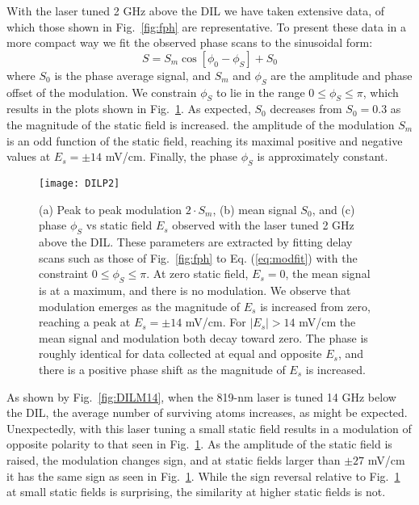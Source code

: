 \documentclass[aps,pra,reprint,groupedaddress]{revtex4-1}
\begin{document}
With the laser tuned 2 GHz above the DIL we have taken extensive data, of which those shown in Fig.~\ref{fig:fph} are representative. To present these data in a more compact way we fit the observed phase scans to the sinusoidal form:
\begin{equation} \label{eq:modfit}
S = S_m \cos{[\phi_0 - \phi_S]} + S_0
\end{equation}
where $S_0$ is the phase average signal, and $S_m$ and $\phi_S$ are the amplitude and phase offset of the modulation. We constrain $\phi_S$ to lie in the range $0\leq \phi_S \leq \pi$, which results in the plots shown in Fig.~\ref{fig:DILP2}. As expected, $S_0$ decreases from $S_0=0.3$  as the magnitude of the static field is increased. the amplitude of the modulation $S_m$ is an odd function of the static field, reaching its maximal positive and negative values at $E_s=\pm 14$ mV/cm. Finally, the phase $\phi_S$ is approximately constant.

\begin{figure}
	\texttt{[image: DILP2]}
	\caption{(a) Peak to peak modulation $2 \cdot S_m$, (b) mean signal $S_0$, and (c) phase $\phi_S$ vs static field $E_s$ observed with the laser tuned 2 GHz above the DIL. These parameters are extracted by fitting delay scans such as those of Fig.~\ref{fig:fph} to Eq. (\ref{eq:modfit}) with the constraint $0 \leq \phi_S \leq \pi$. At zero static field, $E_s = 0$, the mean signal is at a maximum, and there is no modulation. We observe that modulation emerges as the magnitude of $E_s$ is increased from zero, reaching a peak at $E_s = \pm 14$ mV/cm. For $|E_s| > 14$ mV/cm the mean signal and modulation both decay toward zero. The phase is roughly identical for data collected at equal and opposite $E_s$, and there is a positive phase shift as the magnitude of $E_s$ is increased.}
	\label{fig:DILP2}
\end{figure}

As shown by Fig.~\ref{fig:DILM14}, when the 819-nm laser is tuned 14 GHz below the DIL, the average number of surviving atoms increases, as might be expected. Unexpectedly, with this laser tuning a small static field results in a modulation of opposite polarity to that seen in Fig.~\ref{fig:DILP2}. As the amplitude of the static field is raised, the modulation changes sign, and at static fields larger than $\pm 27$ mV/cm it has the same sign as seen in Fig.~\ref{fig:DILP2}. While the sign reversal relative to Fig.~\ref{fig:DILP2} at small static fields is surprising, the similarity at higher static fields is not.
\end{document}
